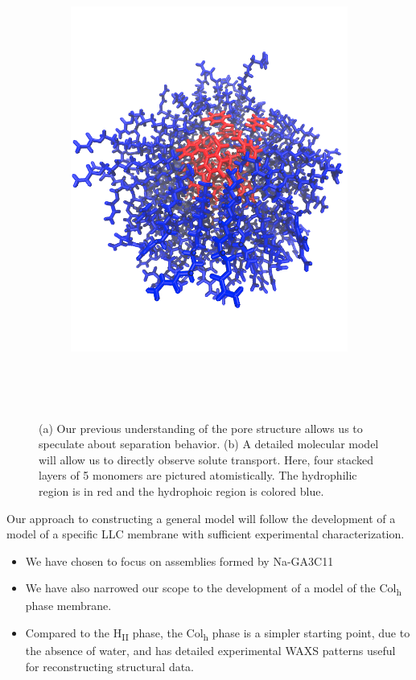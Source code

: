 \documentclass{article}
\begin{document}
\begin{figure}
\begin{subfigure}{0.45\linewidth}
		\includegraphics[width=\textwidth]{detailed_pore.png}
		\caption{}~\label{fig:detailed_pore}
	\end{subfigure}
  \caption{(a) Our previous understanding of the pore structure allows us to speculate
	   about separation behavior. (b) A detailed molecular model will allow us to
	   directly observe solute transport. Here, four stacked layers of 5 monomers
           are pictured atomistically. The hydrophilic region is in red and the 
	   hydrophoic region is colored blue.}~\label{fig:detail}
  \end{figure} 
	
  
  Our approach to constructing a general model will follow the development of a
  model of a specific LLC membrane with sufficient experimental characterization.
    \begin{itemize}
	    \item We have chosen to focus on assemblies formed by Na-GA3C11
	    \item We have also narrowed our scope to the development of 
	    a model of the Col\textsubscript{h} phase membrane.
	    \item Compared to the H\textsubscript{II} phase, the Col\textsubscript{h}
	    phase is a simpler starting point, due to the absence of water, and has
	    detailed experimental WAXS patterns useful for reconstructing structural data.  
    \end{itemize}
\end{document}

